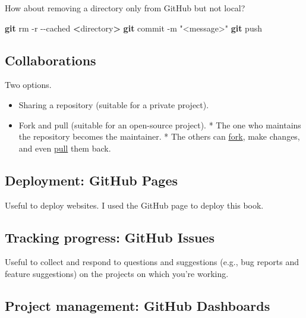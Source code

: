 \documentclass[
]{book}
\newenvironment{Shaded}{\begin{snugshade}}{\end{snugshade}}
\newcommand{\AttributeTok}[1]{\textcolor[rgb]{0.13,0.29,0.53}{#1}}
\newcommand{\FunctionTok}[1]{\textcolor[rgb]{0.13,0.29,0.53}{\textbf{#1}}}
\newcommand{\NormalTok}[1]{#1}
\newcommand{\OperatorTok}[1]{\textcolor[rgb]{0.81,0.36,0.00}{\textbf{#1}}}
\newcommand{\StringTok}[1]{\textcolor[rgb]{0.31,0.60,0.02}{#1}}
\providecommand{\tightlist}{%
  \setlength{\itemsep}{0pt}\setlength{\parskip}{0pt}}
\begin{document}
How about removing a directory only from GitHub but not local?

\begin{Shaded}
\begin{Highlighting}[]
\FunctionTok{git}\NormalTok{ rm }\AttributeTok{{-}r} \AttributeTok{{-}{-}cached} \OperatorTok{\textless{}}\NormalTok{directory}\OperatorTok{\textgreater{}}
\FunctionTok{git}\NormalTok{ commit }\AttributeTok{{-}m} \StringTok{"\textless{}message\textgreater{}"}
\FunctionTok{git}\NormalTok{ push}
\end{Highlighting}
\end{Shaded}

\subsection{Collaborations}\label{collaborations}

Two options.

\begin{itemize}
\tightlist
\item
  Sharing a repository (suitable for a private project).
\item
  Fork and pull (suitable for an open-source project).
  \hspace{0pt} * The one who maintains the repository becomes the maintainer.
  \hspace{0pt} * The others can \href{https://help.GitHub.com/articles/about-forks/}{fork}, make changes, and even \href{https://help.GitHub.com/articles/about-pull-requests/}{pull} them back.
\end{itemize}

\subsection{Deployment: GitHub Pages}\label{deployment-github-pages}

Useful to deploy websites. I used the GitHub page to deploy this book.

\subsection{Tracking progress: GitHub Issues}\label{tracking-progress-github-issues}

Useful to collect and respond to questions and suggestions (e.g., bug reports and feature suggestions) on the projects on which you're working.

\subsection{Project management: GitHub Dashboards}\label{project-management-github-dashboards}
\end{document}
